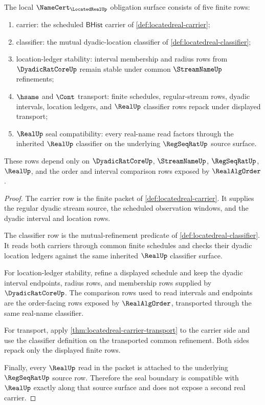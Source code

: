 \begin{theorem}
\label{thm:locatedreal-namecert-obligation-surface}
The local $\NameCert_{\LocatedRealUp}$ obligation surface consists of five finite rows:
\begin{enumerate}
\item carrier: the scheduled $\mathsf{BHist}$ carrier of \autoref{def:locatedreal-carrier};
\item classifier: the mutual dyadic-location classifier of \autoref{def:locatedreal-classifier};
\item location-ledger stability: interval membership and radius rows from $\DyadicRatCoreUp$ remain stable under common $\StreamNameUp$ refinements;
\item $\hsame$ and $\Cont$ transport: finite schedules, regular-stream rows, dyadic intervals, location ledgers, and $\RealUp$ classifier rows repack under displayed transport;
\item $\RealUp$ seal compatibility: every real-name read factors through the inherited $\RealUp$ classifier on the underlying $\RegSeqRatUp$ source surface.
\end{enumerate}
These rows depend only on $\DyadicRatCoreUp$, $\StreamNameUp$, $\RegSeqRatUp$, $\RealUp$, and the order and interval comparison rows exposed by $\RealAlgOrder$.
\end{theorem}
\begin{proof}
The carrier row is the finite packet of \autoref{def:locatedreal-carrier}. It supplies the regular dyadic stream source, the scheduled observation windows, and the dyadic interval and location rows.

The classifier row is the mutual-refinement predicate of \autoref{def:locatedreal-classifier}. It reads both carriers through common finite schedules and checks their dyadic location ledgers against the same inherited $\RealUp$ classifier surface.

For location-ledger stability, refine a displayed schedule and keep the dyadic interval endpoints, radius rows, and membership rows supplied by $\DyadicRatCoreUp$. The comparison rows used to read intervals and endpoints are the order-facing rows exposed by $\RealAlgOrder$, transported through the same real-name classifier.

For transport, apply \autoref{thm:locatedreal-carrier-transport} to the carrier side and use the classifier definition on the transported common refinement. Both sides repack only the displayed finite rows.

Finally, every $\RealUp$ read in the packet is attached to the underlying $\RegSeqRatUp$ source row. Therefore the seal boundary is compatible with $\RealUp$ exactly along that source surface and does not expose a second real carrier.
\end{proof}

